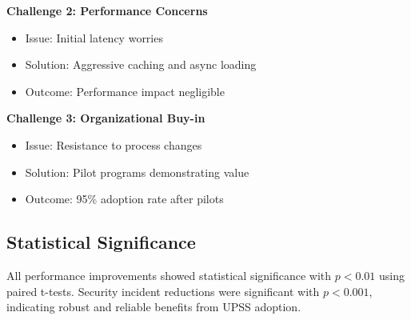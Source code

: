 \textbf{Challenge 2: Performance Concerns}
\begin{itemize}
    \item Issue: Initial latency worries
    \item Solution: Aggressive caching and async loading
    \item Outcome: Performance impact negligible
\end{itemize}

\textbf{Challenge 3: Organizational Buy-in}
\begin{itemize}
    \item Issue: Resistance to process changes
    \item Solution: Pilot programs demonstrating value
    \item Outcome: 95\% adoption rate after pilots
\end{itemize}

\subsection{Statistical Significance}

All performance improvements showed statistical significance with $p < 0.01$ using paired t-tests. Security incident reductions were significant with $p < 0.001$, indicating robust and reliable benefits from UPSS adoption.
